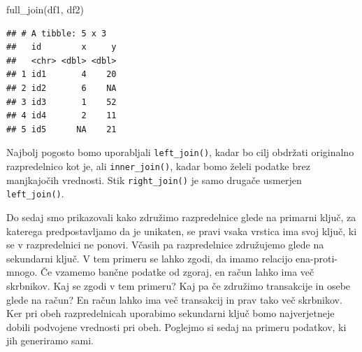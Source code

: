 \documentclass[
]{book}
\newenvironment{Shaded}{\begin{snugshade}}{\end{snugshade}}
\newcommand{\FunctionTok}[1]{\textcolor[rgb]{0.00,0.00,0.00}{#1}}
\newcommand{\NormalTok}[1]{#1}
\begin{document}
\begin{Shaded}
\begin{Highlighting}[]
\FunctionTok{full\_join}\NormalTok{(df1, df2)}
\end{Highlighting}
\end{Shaded}

\begin{verbatim}
## # A tibble: 5 x 3
##   id        x     y
##   <chr> <dbl> <dbl>
## 1 id1       4    20
## 2 id2       6    NA
## 3 id3       1    52
## 4 id4       2    11
## 5 id5      NA    21
\end{verbatim}

Najbolj pogosto bomo uporabljali \texttt{left\_join()}, kadar bo cilj obdržati originalno razpredelnico kot je, ali \texttt{inner\_join()}, kadar bomo želeli podatke brez manjkajočih vrednosti. Stik \texttt{right\_join()} je samo drugače usmerjen \texttt{left\_join()}.

Do sedaj smo prikazovali kako združimo razpredelnice glede na primarni ključ, za katerega predpostavljamo da je unikaten, se pravi vsaka vrstica ima svoj ključ, ki se v razpredelnici ne ponovi. Včasih pa razpredelnice združujemo glede na sekundarni ključ. V tem primeru se lahko zgodi, da imamo relacijo ena-proti-mnogo. Če vzamemo bančne podatke od zgoraj, en račun lahko ima več skrbnikov. Kaj se zgodi v tem primeru? Kaj pa če združimo transakcije in osebe glede na račun? En račun lahko ima več transakcij in prav tako več skrbnikov. Ker pri obeh razpredelnicah uporabimo sekundarni ključ bomo najverjetneje dobili podvojene vrednosti pri obeh. Poglejmo si sedaj na primeru podatkov, ki jih generiramo sami.
\end{document}
